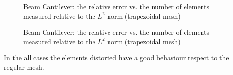 \documentclass[a4paper,11pt]{article}
\begin{document}
\begin{figure}[h!]
\begin{center}
\caption{Beam Cantilever: the relative error vs. the number of elements measured relative to the $L^{2}$ norm (trapezoidal mesh)}
\end{center}
\end{figure}
%
\begin{figure}[h!]
\begin{center}
\caption{Beam Cantilever: the relative error vs. the number of elements measured relative to the $L^{2}$ norm (trapezoidal mesh)}
\end{center}
\end{figure}
In the all cases the elements distorted have a good behaviour respect to the regular mesh.  
\end{document}
